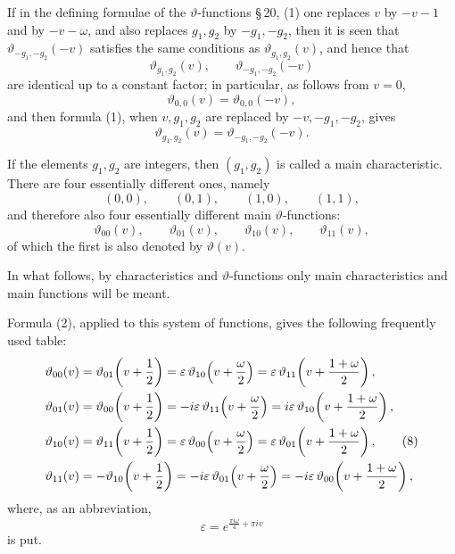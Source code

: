 \documentclass[11pt]{article}
\providecommand{\eps}{\varepsilon}
\providecommand{\eps}{\varepsilon}
\begin{document}
If in the defining formulae of the $\vartheta$-functions \S\,20, (1) one replaces $v$ by $-v-1$ and by $-v-\omega$, and also replaces $g_1,g_2$ by $-g_1,-g_2$, then it is seen that $\vartheta_{-g_1,-g_2}(-v)$ satisfies the same conditions as $\vartheta_{g_1,g_2}(v)$, and hence that
\[
\vartheta_{g_1,g_2}(v),\qquad \vartheta_{-g_1,-g_2}(-v)
\]
are identical up to a constant factor; in particular, as follows from $v=0$,
\[
\vartheta_{0,0}(v)=\vartheta_{0,0}(-v),
\]
and then formula (1), when $v,g_1,g_2$ are replaced by $-v,-g_1,-g_2$, gives
\begin{equation}
\vartheta_{g_1,g_2}(v)=\vartheta_{-g_1,-g_2}(-v).
\tag{6}
\end{equation}

If the elements $g_1,g_2$ are integers, then $(g_1,g_2)$ is called a main characteristic. There are four essentially different ones, namely
\[
(0,0),\qquad (0,1),\qquad (1,0),\qquad (1,1),
\]
and therefore also four essentially different main $\vartheta$-functions:
\begin{equation}
\vartheta_{00}(v),\qquad \vartheta_{01}(v),\qquad \vartheta_{10}(v),\qquad \vartheta_{11}(v),
\tag{7}
\end{equation}
of which the first is also denoted by $\vartheta(v)$.

In what follows, by characteristics and $\vartheta$-functions only main characteristics and main functions will be meant.

Formula (2), applied to this system of functions, gives the following frequently used table:
\begin{align}
\vartheta_{00}(v)&=\vartheta_{01}\!\left(v+\frac12\right)=\eps\,\vartheta_{10}\!\left(v+\frac{\omega}{2}\right)=\eps\,\vartheta_{11}\!\left(v+\frac{1+\omega}{2}\right),\notag\\
\vartheta_{01}(v)&=\vartheta_{00}\!\left(v+\frac12\right)=-i\eps\,\vartheta_{11}\!\left(v+\frac{\omega}{2}\right)=i\eps\,\vartheta_{10}\!\left(v+\frac{1+\omega}{2}\right),\notag\\
\vartheta_{10}(v)&=\vartheta_{11}\!\left(v+\frac12\right)=\eps\,\vartheta_{00}\!\left(v+\frac{\omega}{2}\right)=\eps\,\vartheta_{01}\!\left(v+\frac{1+\omega}{2}\right),\tag{8}\\
\vartheta_{11}(v)&=-\vartheta_{10}\!\left(v+\frac12\right)=-i\eps\,\vartheta_{01}\!\left(v+\frac{\omega}{2}\right)=-i\eps\,\vartheta_{00}\!\left(v+\frac{1+\omega}{2}\right),
\notag
\end{align}
where, as an abbreviation,
\[
\eps=e^{\frac{\pi i\omega}{4}+\pi i v}
\]
is put.
\end{document}
